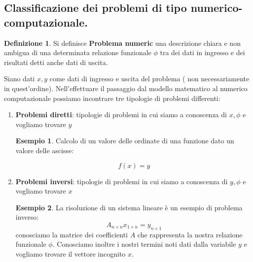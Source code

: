 \documentclass[12pt, a4paper]{book}
\theoremstyle{definition}
\newtheorem{exmp}{Esempio}[section]
\newtheorem{defn}{Definizione}[section]
\begin{document}
\subsection{Classificazione dei problemi di tipo numerico-computazionale.}
\begin{flushleft}

\begin{defn}
	Si definisce \textbf{Problema numeric} una descrizione chiara e non ambigua di una determinata relazione funzionale $\phi$ tra dei dati in ingresso e dei risultati detti anche dati di uscita. 
\end{defn}
\vspace{1cm}

Siano dati $x,y$ come dati di ingresso e uscita del problema ( non necessariamente in quest'ordine).
Nell'effettuare il passaggio dal modello matematico al numerico computazionale possiamo incontrare tre tipologie di problemi differenti: 

\begin{enumerate}
	\item \textbf{Problemi diretti}: tipologie di problemi in cui siamo a conoscenza di $x, \phi$ e vogliamo trovare $y$
\begin{exmp}

Calcolo di un valore delle ordinate di una funzione dato un valore delle ascisse:

\[
	f(x) = y
\]
\end{exmp}
\item \textbf{Problemi inversi}: tipologie di problemi in cui siamo a conoscenza di $y, \phi$ e vogliamo trovare $x$
\begin{exmp}
La risoluzione di un sistema lineare è un esempio di problema inverso: 
\[ 
	A_{n \times n} x_{1 \times n} = y_{n \times 1}
\]
conosciamo la matrice dei coefficienti $A$ che rappresenta la nostra relazione funzionale $\phi$.  Conosciamo inoltre i nostri termini noti dati dalla variabile $y$ e vogliamo trovare il vettore incognito $x$.
\end{exmp}


\end{enumerate}
\end{flushleft}
\end{document}
